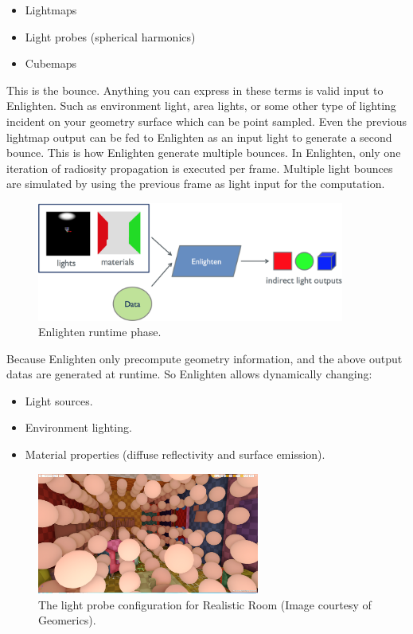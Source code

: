 \begin{itemize}
	\item Lightmaps
	\item Light probes (spherical harmonics)
	\item Cubemaps
\end{itemize}

This is the bounce. Anything you can express in these terms is valid input to Enlighten. Such as environment light, area lights, or some other type of lighting incident on your geometry surface which can be point sampled. Even the previous lightmap output can be fed to Enlighten as an input light to generate a second bounce. This is how Enlighten generate multiple bounces. In Enlighten, only one iteration of radiosity propagation is executed per frame. Multiple light bounces are simulated by using the previous frame as light input for the computation.
 
 \begin{figure}\label{f:enlighten-precompute}
	\begin{center}
		\includegraphics[width=0.9\textwidth]{graphics/gi/path-29-2}
	\end{center}
	\caption{Enlighten runtime phase.}
\end{figure}

Because Enlighten only precompute geometry information, and the above output datas are generated at runtime. So Enlighten allows dynamically changing:

\begin{itemize}
	\item Light sources.
	\item Environment lighting.
	\item Material properties (diffuse reflectivity and surface emission).
\end{itemize}

\begin{figure}
\sidecaption
	\includegraphics[width=0.65\textwidth]{graphics/gi/path-27}
	\caption{The light probe configuration for Realistic Room (Image courtesy of Geomerics).}
	\label{f:enlighten-light-probe}
\end{figure}

